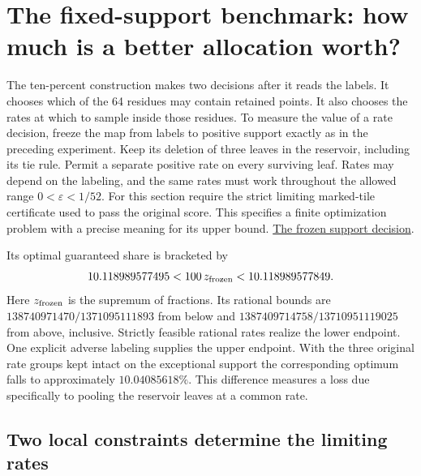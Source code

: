 \documentclass[12pt,letterpaper]{article}
\begin{document}
\section{The fixed-support benchmark: how much is a better allocation worth?}
\label{sec:fixed-support-rates}

The ten-percent construction makes two decisions after it reads the labels. It chooses which of the 64 residues may contain retained points. It also chooses the rates at which to sample inside those residues. To measure the value of a rate decision, freeze the map from labels to positive support exactly as in the preceding experiment. Keep its deletion of three leaves in the reservoir, including its tie rule. Permit a separate positive rate on every surviving leaf. Rates may depend on the labeling, and the same rates must work throughout the allowed range \(0<\varepsilon<1/52\). For this section require the strict limiting marked-tile certificate used to pass the original score. This specifies a finite optimization problem with a precise meaning for its upper bound.
\href{https://github.com/nousentllc/riemann-hypothesis/blob/d67de1f6716496b98c8f0eb9f16b2a38c4f789c4/research/uriel/experiments/ten-percent-study/evidence/alternative/AUDIT.md}{The frozen support decision}.

Its optimal guaranteed share is bracketed by
\[
 10.118989577495 < 100\,z_{\rm frozen} < 10.118989577849 .
\]
Here \(z_{\rm frozen}\) is the supremum of fractions. Its rational bounds are \(138740971470/1371095111893\) from below and \(1387409714758/13710951119025\) from above, inclusive. Strictly feasible rational rates realize the lower endpoint. One explicit adverse labeling supplies the upper endpoint. With the three original rate groups kept intact on the exceptional support the corresponding optimum falls to approximately \(10.04085618\%\). This difference measures a loss due specifically to pooling the reservoir leaves at a common rate.

\subsection{Two local constraints determine the limiting rates}
\end{document}
